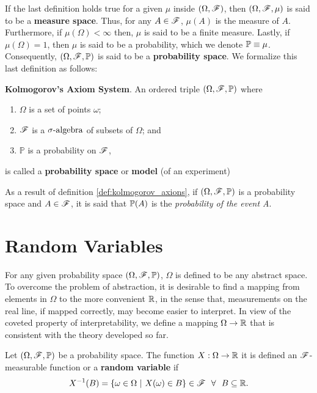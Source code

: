 \documentclass[../TGMAFFIRO.tex]{subfiles}
\begin{document}
If the last definition holds true for a given $\mu$ inside $(\Omega, \mathscr{F})$, then $(\Omega, \mathscr{F}, \mu)$ is said to be a \textbf{measure space}. Thus, for any $A\in\mathscr{F}$, $\mu(A)$ is the measure of $A$.\\

 Furthermore, if $\mu(\Omega) < \infty$ then, $\mu$ is said to be a finite measure. Lastly, if  $\mu(\Omega) = 1$, then $\mu$ is said to be a probability, which we denote $\mathbb{P} \equiv \mu$. Consequently, $(\Omega, \mathscr{F}, \mathbb{P})$ is said to be a \textbf{probability space}. We formalize this last definition as follows:

\begin{definition}{\textbf{Kolmogorov's Axiom System}.} 	\label{def:kolmogorov_axions}
	An ordered triple $(\Omega, \mathscr{F}, \mathbb{P})$ where
	\begin{enumerate}
		\item $\Omega$ is a set of points $\omega$;
		\item $\mathscr{F}$ is a $\sigma\text{-algebra}$ of subsets of $\Omega$; and
		\item $\mathbb P$ is a probability on $\mathscr{F}$,
	\end{enumerate}
	is called a \textbf{probability space} or \textbf{model} (of an experiment)
\end{definition}

As a result of definition \ref{def:kolmogorov_axions}, if $(\Omega, \mathscr{F}, \mathbb{P})$ is a probability space and $A \in \mathscr{F}$, it is said that $\mathbb{P}(A)$ is the \textit{probability of the event A}.

\section{Random Variables}
For any given probability space $(\Omega, \mathscr{F}, \mathbb{P})$, $\Omega$ is defined to be any abstract space. To overcome the problem of abstraction, it is desirable to find a mapping from elements in $\Omega$ to the more convenient $\mathbb{R}$, in the sense that, measurements on the real line, if mapped correctly, may become easier to interpret. In view of the coveted property of interpretability, we define a mapping $\Omega\to\mathbb{R}$ that is consistent with the theory developed so far.

\begin{definition}\label{def:rvar}
	Let $(\Omega, \mathscr{F}, \mathbb{P})$ be a probability space. The function $X: \Omega \rightarrow \mathbb{R}$ it is defined an $\mathscr{F}$-measurable function or a \textbf{random variable} if
	\begin{equation}
		X^{-1}(B) = \{\omega \in \Omega \ | \ X(\omega) \in B\} \in \mathscr{F} \ \ \forall \ \ B \subseteq \mathbb{R}.
	\end{equation}
\end{definition}
\end{document}
